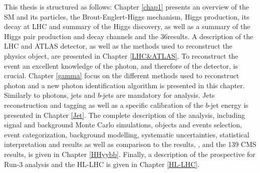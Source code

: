 This thesis is structured as follows: Chapter \ref{chap1} presents an overview of the SM and its particles, the Brout-Englert-Higgs mechanism, Higgs production, its decay at LHC and summary of the Higgs discovery, as well as a summary of the Higgs pair production and decay channels and the 36\ifb results. A description of the LHC and ATLAS detector, as well as the methods used to reconstruct the physics object, are presented in Chapter \ref{LHC&ATLAS}. To reconstruct the \HHyybb event an excellent knowledge of the photon, and therefore of the detector, is crucial. Chapter \ref{gamma} focus on the different methods used to reconstruct photon and a new photon identification algorithm is presented in this chapter. Similarly to photons, jets and $b$-jets are mandatory for \HHyybb analysis. Jets reconstruction and tagging as well as a specific calibration of the $b$-jet energy is presented in Chapter \ref{Jet}. The complete description of the \HHyybb analysis, including signal and background Monte Carlo simulations, objects and events selection, event categorization, background modelling, systematic uncertainties, statistical interpretation and results as well as comparison to the  \ifb results, \bbbb, \bbtt and the 139 \ifb CMS \HHyybb results, is given in Chapter \ref{HHyybb}. Finally, a description of the prospective for Run-3 analysis and the HL-LHC is given in Chapter \ref{HL-LHC}. 
